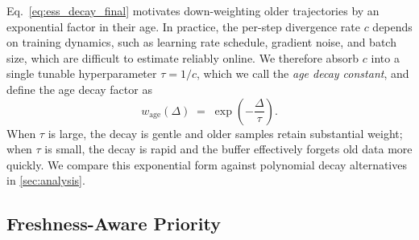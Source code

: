 \documentclass[runningheads]{llncs}
\begin{document}




Eq.~\eqref{eq:ess_decay_final} motivates down-weighting older trajectories by an exponential factor in their age.
In practice, the per-step divergence rate $c$ depends on training dynamics, such as learning rate schedule, gradient noise, and batch size, which are difficult to estimate reliably online.
We therefore absorb $c$ into a single tunable hyperparameter $\tau = 1/c$, which we call the \emph{age decay constant}, and define the age decay factor as
\begin{equation}
    w_{\mathrm{age}}(\Delta) \;=\; \exp\!\left(-\frac{\Delta}{\tau}\right).
    \label{eq:age_decay}
\end{equation}
When $\tau$ is large, the decay is gentle and older samples retain substantial weight; when $\tau$ is small, the decay is rapid and the buffer effectively forgets old data more quickly.
We compare this exponential form against polynomial decay alternatives in \cref{sec:analysis}.


\subsection{Freshness-Aware Priority}
\label{sec:fresh_priority}
\end{document}
